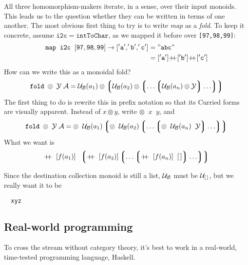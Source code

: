 All three homomorphism-makers iterate, in a sense, over their input monoids. This leads us to the question whether they can be written in terms of one another. The most obvious first thing to try is to write \emph{map} as a \emph{fold}. To keep it concrete, assume $\mathtt{i2c}=\mathtt{intToChar}$, as we mapped it before over \verb"[97,98,99]":
\begin{align*}
   \mathtt{map\;\;i2c\;\;[97,98,99]}\rightarrow
   \mathtt{['a','b','c']}&=\mathtt{"abc"} \\
   {}&= \mathtt{['a']}\pp\mathtt{['b']}\pp\mathtt{['c']}
\end{align*}
How can we write this as a monoidal fold?  
\[  \mathtt{fold}\;\otimes\;\mathcal{Y}\;\mathcal{A} =
      \mathcal{U}_{\mathcal{B}}(a_1)\otimes
      \left\lgroup
      \mathcal{U}_{\mathcal{B}}(a_2)\otimes
      \left\lgroup\ldots\left\lgroup
      \mathcal{U}_{\mathcal{B}}(a_n)\otimes
      \mathit{\mathcal{Y}}
      \right\rgroup\ldots\right\rgroup
      \right\rgroup  \]
The first thing to do is rewrite this in prefix notation so that its Curried forms are visually apparent. Instead of $x\otimes y$, write $\otimes\;\;x\;\;y$, and
\[  \mathtt{fold}\;\otimes\;\mathcal{Y}\;\mathcal{A} =
      \otimes\;\;\mathcal{U}_{\mathcal{B}}(a_1)
      \left\lgroup
      \otimes\;\;\mathcal{U}_{\mathcal{B}}(a_2)
      \left\lgroup\ldots\left\lgroup
      \otimes\;\;\mathcal{U}_{\mathcal{B}}(a_n)
      \;\;\mathit{\mathcal{Y}}
      \right\rgroup\ldots\right\rgroup
      \right\rgroup  \]
What we want is
\[    \pp\;\;[f(a_1)]\;\;
      \left\lgroup
      \pp\;\;[f(a_2)]
      \left\lgroup\ldots\left\lgroup
      \pp\;\;[f(a_n)]
      \;\;\emptylist
      \right\rgroup\ldots\right\rgroup
      \right\rgroup  \]


Since the destination collection monoid is still a list, $\mathcal{U}_{\mathcal{B}}$ must be $\mathcal{U}_{\mathcal{[\,]}}$, but we really want it to be 


\begin{verbatim}
  xyz
\end{verbatim}

\subsection{\color{Red}Real-world programming}


To cross the stream without category theory, it's best to work in a real-world, time-tested programming language, Haskell. 


